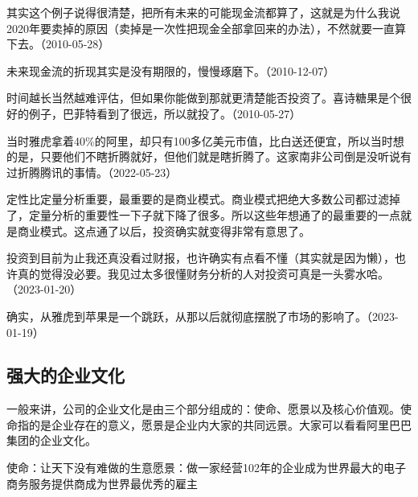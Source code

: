 其实这个例子说得很清楚，把所有未来的可能现金流都算了，这就是为什么我说2020年要卖掉的原因（卖掉是一次性把现金全部拿回来的办法），不然就要一直算下去。（2010-05-28）


未来现金流的折现其实是没有期限的，慢慢琢磨下。（2010-12-07）


时间越长当然越难评估，但如果你能做到那就更清楚能否投资了。喜诗糖果是个很好的例子，巴菲特看到了很远，所以就投了。（2010-05-27）


当时雅虎拿着40\%的阿里，却只有100多亿美元市值，比白送还便宜，所以当时想的是，只要他们不瞎折腾就好，但他们就是瞎折腾了。这家南非公司倒是没听说有过折腾腾讯的事情。（2022-05-23）


定性比定量分析重要，最重要的是商业模式。商业模式把绝大多数公司都过滤掉了，定量分析的重要性一下子就下降了很多。所以这些年想通了的最重要的一点就是商业模式。这点通了以后，投资确实就变得非常有意思了。


投资到目前为止我还真没看过财报，也许确实有点看不懂（其实就是因为懒），也许真的觉得没必要。我见过太多很懂财务分析的人对投资可真是一头雾水哈。（2023-01-20）


确实，从雅虎到苹果是一个跳跃，从那以后就彻底摆脱了市场的影响了。（2023-01-19）

\subsection{强大的企业文化}

一般来讲，公司的企业文化是由三个部分组成的：使命、愿景以及核心价值观。使命指的是企业存在的意义，愿景是企业内大家的共同远景。大家可以看看阿里巴巴集团的企业文化。

使命：让天下没有难做的生意愿景：做一家经营102年的企业成为世界最大的电子商务服务提供商成为世界最优秀的雇主

